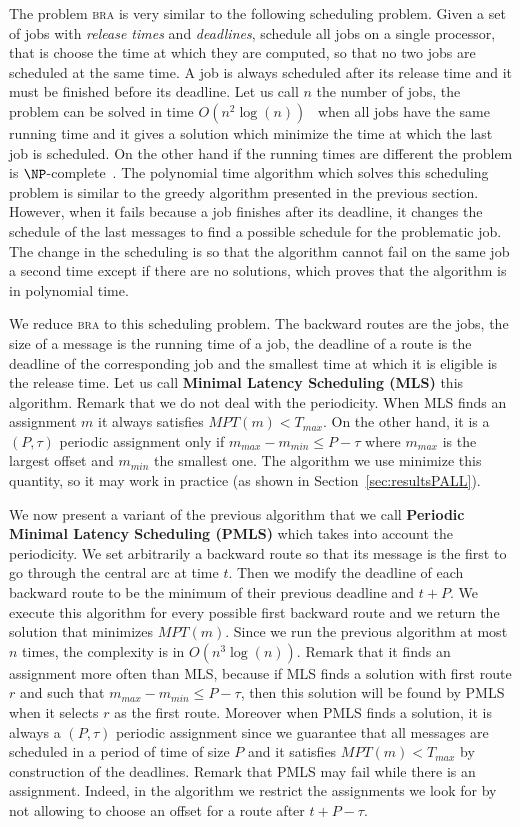 \documentclass[10pt, conference, letterpaper]{IEEEtran}
\newcommand\bra{\textsc{bra}\xspace}
\begin{document}
     
     The problem \bra is very similar to the following scheduling problem. Given a set of jobs with \emph{release times} and  \emph{deadlines}, schedule all jobs on a single processor, that is choose the time at which they are computed, so that no two jobs are scheduled at the same time. A job is always scheduled after its release time and it must be finished before its deadline. Let us call $n$ the number of jobs, the problem can be solved in time $O(n^2\log(n))$~\cite{simons1978fast} when all jobs have the same running time and it gives a solution which minimize the time at which the last job is scheduled. On the other hand if the running times are different the problem is $\NP$-complete~\cite{lenstra1977complexity}. 
     The  polynomial time algorithm  which solves this scheduling problem is similar to the greedy algorithm presented in the previous section. However, when it fails because a job finishes after its deadline, it changes the schedule of the last messages to find a possible schedule for the problematic job. The change in the scheduling is so that the algorithm cannot fail on the same job a second time except if there are no solutions, which proves that the algorithm is in polynomial time.
     
     We reduce \bra to this scheduling problem. The backward routes are the jobs, the size of a message is the running time of a job,
     the deadline of a route is the deadline of the corresponding job and the smallest time at which it is eligible is the release time. Let us call {\bf Minimal Latency Scheduling (MLS)} this algorithm.
     Remark that we do not deal with the periodicity. When MLS finds an assignment $m$ it always satisfies $MPT(m) < T_{max}$. On the other hand, it is a $(P,\tau)$ periodic assignment only if $m_{max} - m_{min} \leq P -\tau$ where $m_{max}$ is the largest offset and $m_{min}$ the smallest one. The algorithm we use minimize this quantity, so it may work in practice (as shown in Section~\ref{sec:resultsPALL}).
     
     We now present a variant of the previous algorithm that we call {\bf Periodic Minimal Latency Scheduling (PMLS)}
     which takes into account the periodicity. We set arbitrarily a backward route so that its message is the first to go through the central arc at time $t$. Then we modify the deadline of each backward route to be the minimum of their previous deadline and $t + P$.  We execute this algorithm for every possible first backward route and we return the solution that minimizes $MPT(m)$. Since we run the previous algorithm at most $n$ times, the complexity is in $O(n^3\log(n))$. Remark that it finds an assignment more often than MLS, because if MLS finds a solution with first route $r$ and such that $m_{max} - m_{min} \leq P -\tau$, then this solution will be found by PMLS when it selects $r$ as the first route. Moreover when PMLS finds a solution, it is always a $(P,\tau)$ periodic assignment since we guarantee that all messages are scheduled in a period of time of size $P$ and it satisfies $MPT(m) < T_{max}$ by construction of the deadlines. Remark that PMLS may fail while there is an assignment. Indeed, in the algorithm we restrict the assignments we look for by not allowing to choose an offset for a route after $t+P- \tau$.
     
\end{document}
